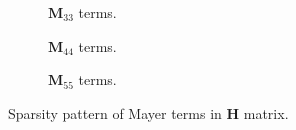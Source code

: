 \begin{figure}[ht]

\centering

\begin{subfigure}{0.33\textwidth}
\centering
\begin{minipage}{1\textwidth}

\end{minipage}
\caption{$\bm{M}_{33}$ terms.}
\end{subfigure}%
\begin{subfigure}{0.33\textwidth}
\centering
\begin{minipage}{1\textwidth}

\end{minipage}
\caption{$\bm{M}_{44}$ terms.}
\end{subfigure}%
\begin{subfigure}{0.33\textwidth}
\centering
\begin{minipage}{1\textwidth}

\end{minipage}
\caption{$\bm{M}_{55}$ terms.}
\end{subfigure}%

% 

\caption{Sparsity pattern of Mayer terms in $\mathbf{H}$ matrix.}
\label{fig:figsparsityHmayer}
\end{figure}




% 	
% 	
% 	

% 	

